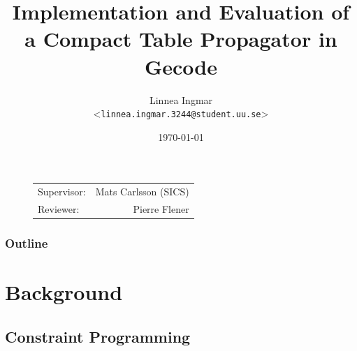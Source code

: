\documentclass{beamer}
\title{Implementation and Evaluation of a Compact Table Propagator in Gecode}
\author[Linnea Ingmar | \emph{linnea.ingmar.3244@student.uu.se}] %
{Linnea Ingmar \\ <\texttt{linnea.ingmar.3244@student.uu.se}>}
\institute[Dept. of Information Technology] %
{
  The ASTRA Group\\ on Combinatorial Optimisation \\
  Uppsala University
}
\date[\today] %
{\today}
\begin{document}
\begin{frame}[plain] %
  \titlepage
  
  \begin{figure}
    \begin{flushright}
        \begin{tabular}[t,right]{lr}
          Supervisor: & Mats Carlsson (SICS) \\
          Reviewer:   & Pierre Flener
        \end{tabular}
      \end{flushright}
  \end{figure}

\end{frame}

\begin{frame}
    \frametitle{Outline}
    \tableofcontents[currentsection]
\end{frame}

\section{Background}

\subsection{Constraint Programming}
\end{document}

